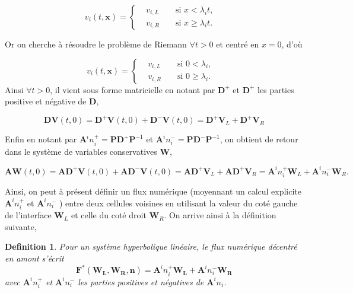 \documentclass[a4paper,oneside,10pt]{report}
\newtheorem{mydef}{Definition}
\begin{document}
\begin{equation}
v_i(t,\mathbf{x}) = \left\{
\begin{aligned}
&v_{i,L}& &\mbox{ si } x < \lambda_it,&\\
&v_{i,R}& &\mbox{ si } x \geq \lambda_it.&
\end{aligned}
\right.
\end{equation}


Or on cherche à résoudre le problème de Riemann $\forall t > 0$ et  centré en $x=0$, d'où


\begin{equation}
v_i(t,\mathbf{x}) = \left\{
\begin{aligned}
&v_{i,L}& &\mbox{ si }  0 <\lambda_i,&\\
&v_{i,R}& &\mbox{ si } 0 \geq \lambda_i .&
\end{aligned}
\right.
\end{equation}
 Ainsi $\forall t > 0$, il vient sous forme matricielle en notant par $\mathbf{D}^+$ et $\mathbf{D}^+$ les parties positive et négative de $\mathbf{D}$,

\begin{equation}
\mathbf{D} \mathbf{V}(t,0) = \mathbf{D}^+\mathbf{V}(t,0) + \mathbf{D}^-\mathbf{V}(t,0)  =  \mathbf{D}^+\mathbf{V}_L  + \mathbf{D}^+\mathbf{V}_R 
\end{equation}
 
 Enfin en notant par $\mathbf{A}^in_i^+= \mathbf{P}\mathbf{D}^+\mathbf{P}^{-1}$ et  $\mathbf{A}^in_i^-= \mathbf{P}\mathbf{D}^-\mathbf{P}^{-1}$, on obtient de retour dans le système de variables conservatives $\mathbf{W}$,
 
 \begin{equation}
 \label{flux1}
\mathbf{A} \mathbf{W}(t,0) = \mathbf{A} \mathbf{D}^+\mathbf{V}(t,0) + \mathbf{A}\mathbf{D}^-\mathbf{V}(t,0)  =  \mathbf{A}\mathbf{D}^+\mathbf{V}_L  + \mathbf{A} \mathbf{D}^+\mathbf{V}_R = \mathbf{A}^in_i^+\mathbf{W}_L + \mathbf{A}^in_i^-\mathbf{W}_R.
\end{equation}
 
Ainsi, on peut à présent définir un flux numérique (moyennant un calcul explicite $\mathbf{A}^i n_i^+$ et $\mathbf{A}^i n_i^-$ ) entre deux cellules voisines en utilisant la valeur du coté gauche de l'interface $\mathbf{W}_L$ et celle du coté droit $\mathbf{W}_R$. On arrive ainsi à la définition suivante,
 
\begin{mydef}
Pour un système hyperbolique linéaire, le flux numérique décentré en amont s'écrit 
 \begin{equation}
 \mathbf{F}^*(\mathbf{W_L},\mathbf{W_R},\mathbf{n}) = \mathbf{A}^i n_i^+\mathbf{W_L} + \mathbf{A}^i n_i^-\mathbf{W_R}
 \end{equation}
 avec $\mathbf{A}^i n_i^+$ et $\mathbf{A}^i n_i^-$ les parties positives et négatives de $\mathbf{A}^i n_i$.
\end{mydef}
\end{document}
